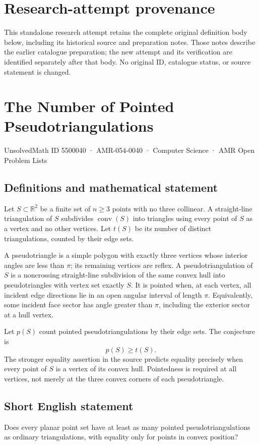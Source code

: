 \documentclass[11pt,a4paper]{article}
\begin{document}
\section*{Research-attempt provenance}
This standalone research attempt retains the complete original definition body below,
including its historical source and preparation notes. Those notes describe the
earlier catalogue preparation; the new attempt and its verification are identified
separately after that body. No original ID, catalogue status, or source statement is changed.

\section*{The Number of Pointed Pseudotriangulations}\label{5500040}
{\small UnsolvedMath ID 5500040 · AMR-054-0040 · Computer Science · AMR Open Problem Lists}
\subsection{Definitions and mathematical statement}
Let $S\subset\mathbb R^2$ be a finite set of $n\ge3$ points with no
three collinear. A straight-line triangulation of $S$ subdivides
$\operatorname{conv}(S)$ into triangles using every point of $S$ as
a vertex and no other vertices. Let $t(S)$ be its number of distinct
triangulations, counted by their edge sets.

A pseudotriangle is a simple polygon with exactly three vertices
whose interior angles are less than $\pi$; its remaining vertices
are reflex. A pseudotriangulation of $S$ is a noncrossing straight-line
subdivision of the same convex hull into pseudotriangles with vertex
set exactly $S$. It is pointed when, at each vertex, all incident
edge directions lie in an open angular interval of length $\pi$.
Equivalently, some incident face sector has angle greater than $\pi$,
including the exterior sector at a hull vertex.

Let $p(S)$ count pointed pseudotriangulations by their edge sets.
The conjecture is
\[
                            p(S)\ge t(S).
\]
The stronger equality assertion in the source predicts equality
precisely when every point of $S$ is a vertex of its convex hull.
Pointedness is required at all vertices, not merely at the three
convex corners of each pseudotriangle.
\subsection{Short English statement}
Does every planar point set have at least as many pointed
pseudotriangulations as ordinary triangulations, with equality only
for points in convex position?
\end{document}
